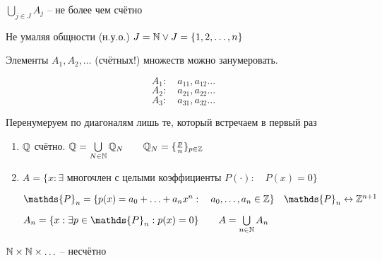         $\bigcup\limits_{j\in J} A_j$ -- не более чем счётно

        Не умаляя общности (н.у.о.) $J = \mathbb{N} \vee J = \{1, 2, \ldots, n\}$

        Элементы $A_1, A_2, \ldots$ (счётных!) множеств можно занумеровать.

        \[A_1:\quad a_{11}, a_{12} \ldots\]
        \[A_2:\quad a_{21}, a_{22} \ldots\]
        \[A_3:\quad a_{31}, a_{32} \ldots\]

        Перенумеруем по диагоналям лишь те, который встречаем в первый раз

    \begin{corollary}
        \begin{enumerate}
            \item 
                $\mathbb{Q}$ счётно. $\mathbb{Q} = \bigcup\limits_{N\in \mathbb{N} } \mathbb{Q}_N\qquad \mathbb{Q}_N = \{\frac{p}{n}\}_{p\in \mathbb{Z} }$
            \item $A = \{x: \exists \text{ многочлен с целыми коэффициенты } P(\cdot ):\quad P(x) = 0\}$

                $\mathds{P}_n = \{p(x) = a_0 + \ldots + a_nx^n:\quad a_0, \ldots, a_n\in \Z \}\quad \mathds{P}_n \leftrightarrow \Z ^{n+1}$

                $A_n = \{x:\exists p\in \mathds{P}_n: p(x) = 0\}\qquad A = \bigcup\limits_{n\in \N } A_n$
        \end{enumerate}

    \end{corollary}

    \begin{problem}
        $\mathbb{N} \times \mathbb{N} \times \ldots$ -- несчётно
    \end{problem}

